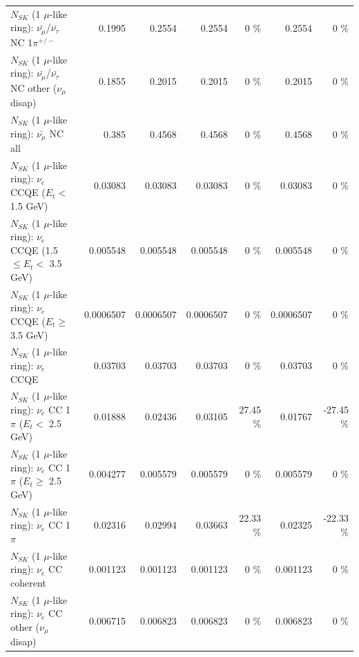 \begin{table}
\begin{tabular}{| l | r | r | r  r | r  r |}
\hline
  $N_{SK}$ (1 $\mu$-like ring): $\bar{\nu_\mu}$/$\bar{\nu_\tau}$ NC 1$\pi^{+/-}$ &          0.1995 &          0.2554 &          0.2554 &        0 \%  &          0.2554 &        0 \%  \\ 
$N_{SK}$ (1 $\mu$-like ring): $\bar{\nu_\mu}$/$\bar{\nu_\tau}$ NC other ($\nu_\mu$ disap) &          0.1855 &          0.2015 &          0.2015 &        0 \%  &          0.2015 &        0 \%  \\ 
                          $N_{SK}$ (1 $\mu$-like ring): $\bar{\nu_{\mu}}$ NC all &           0.385 &          0.4568 &          0.4568 &        0 \%  &          0.4568 &        0 \%  \\ 
\hline
\hline
\hline
                  $N_{SK}$ (1 $\mu$-like ring): $\nu_e$ CCQE ($E_{t} <$ 1.5 GeV) &         0.03083 &         0.03083 &         0.03083 &        0 \%  &         0.03083 &        0 \%  \\ 
         $N_{SK}$ (1 $\mu$-like ring): $\nu_e$ CCQE (1.5 $\leq E_{t} <$ 3.5 GeV) &        0.005548 &        0.005548 &        0.005548 &        0 \%  &        0.005548 &        0 \%  \\ 
               $N_{SK}$ (1 $\mu$-like ring): $\nu_e$ CCQE ($E_{t} \geq$ 3.5 GeV) &       0.0006507 &       0.0006507 &       0.0006507 &        0 \%  &       0.0006507 &        0 \%  \\ 
\hline
                                      $N_{SK}$ (1 $\mu$-like ring): $\nu_e$ CCQE &         0.03703 &         0.03703 &         0.03703 &        0 \%  &         0.03703 &        0 \%  \\ 
\hline
             $N_{SK}$ (1 $\mu$-like ring): $\nu_e$ CC 1$\pi$ ($E_{t} <$ 2.5 GeV) &         0.01888 &         0.02436 &         0.03105 &    27.45 \%  &         0.01767 &   -27.45 \%  \\ 
          $N_{SK}$ (1 $\mu$-like ring): $\nu_e$ CC 1$\pi$ ($E_{t} \geq$ 2.5 GeV) &        0.004277 &        0.005579 &        0.005579 &        0 \%  &        0.005579 &        0 \%  \\ 
\hline
                                 $N_{SK}$ (1 $\mu$-like ring): $\nu_e$ CC 1$\pi$ &         0.02316 &         0.02994 &         0.03663 &    22.33 \%  &         0.02325 &   -22.33 \%  \\ 
                               $N_{SK}$ (1 $\mu$-like ring): $\nu_e$ CC coherent &        0.001123 &        0.001123 &        0.001123 &        0 \%  &        0.001123 &        0 \%  \\ 
                $N_{SK}$ (1 $\mu$-like ring): $\nu_e$ CC other ($\nu_\mu$ disap) &        0.006715 &        0.006823 &        0.006823 &        0 \%  &        0.006823 &        0 \%  \\ 

\end{tabular}
\end{table}
